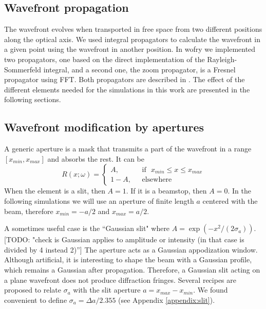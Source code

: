 \documentclass{iucr}              %
\newcommand{\todo}[1]{{\color{red}[TODO: "#1'']}}
\begin{document}
\subsection{Wavefront propagation}


The wavefront evolves when transported in free space from two different positions along the optical axis. We used integral propagators to calculate the wavefront in a given point using the wavefront in another position. In wofry we implemented two propagators, one based on the direct implementation of the  Rayleigh-Sommerfeld integral, and a second one, the zoom propagator, is a Fresnel propagator using FFT. Both propagators are described in \cite{srioLBL}. The effect of the different elements needed for the simulations in this work are presented in the following sections. 


\subsection{Wavefront modification by apertures}

A generic aperture is a mask that transmits a part of the wavefront in a range $[x_{min},x_{max}]$ and absorbs the rest. It can be
\begin{equation}
R(x;\omega) =
\left\{
\begin{matrix}
A,  & \mbox{~~if~~} x_{min} \le x \le x_{max}
\\ 
1 - A, & \mbox{~~elsewhere}
\end{matrix}
\right.
\end{equation}
When the element is a slit, then $A=1$. If it is a beamstop, then $A=0$. In the following simulations we will use an aperture of finite length $a$ centered with the beam, therefore $x_{min}=-a/2$ and $x_{max}=a/2$.

A sometimes useful case is the ``Gaussian slit" where $A=\exp(-x^2/(2\sigma_a))$. \todo{check is Gaussian applies to amplitude or intensity (in that case is divided by 4 instead 2)} The aperture acts as a Gaussian appodization window. Although artificial, it is interesting to shape the beam with a Gaussian profile, which remains a Gaussian after propagation. Therefore, a Gaussian slit acting on a plane wavefront does not produce diffraction fringes. Several recipes are proposed to relate $\sigma_a$ with the slit aperture $a=x_{max}-x_{min}$. We found convenient to define $\sigma_a=\Delta a/2.355$ (see Appendix \ref{appendix:slit}).
\end{document}
